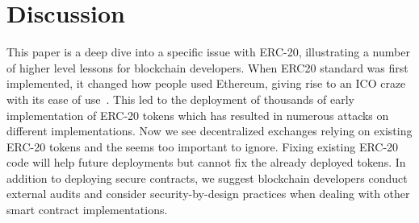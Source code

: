 \section{Discussion}
This paper is a deep dive into a specific issue with ERC-20, illustrating a number of higher level lessons for blockchain developers. When ERC20 standard was first implemented, it changed how people used Ethereum, giving rise to an ICO craze with its ease of use~\cite{fenu2018ico}. This led to the deployment of thousands of early implementation of ERC-20 tokens which has resulted in numerous attacks on different implementations. Now we see decentralized exchanges relying on existing ERC-20 tokens and the \mwa seems too important to ignore. Fixing existing ERC-20 code will help future deployments but cannot fix the already deployed tokens. In addition to deploying secure contracts, we suggest blockchain developers conduct external audits and consider security-by-design practices when dealing with other smart contract implementations. 

